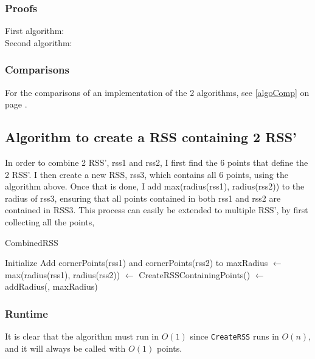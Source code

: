 \subsubsection{Proofs}
\begin{description}
\item[First algorithm:]

\item[Second algorithm:]
\end{description}

\subsubsection{Comparisons}
For the comparisons of an implementation of the 2 algorithms, see \ref{algoComp} on page \pageref{algoComp}.

\subsection{Algorithm to create a RSS containing 2 RSS'}
In order to combine  2 RSS', rss1 and rss2, I first find the 6 points that define the 2 RSS'. I then create a new RSS, rss3, which contains all 6 points, using the algorithm above. Once that is done, I add  max(radius(rss1), radius(rss2)) to the radius of rss3, ensuring that all points contained in both rss1 and rss2 are contained in RSS3. This process can easily be extended to multiple RSS', by first collecting all the points, 

\begin{algorithm}[H]
  \caption{CombinedRSS}
   
  \dontprintsemicolon
  Initialize \points \;
  Add cornerPoints(rss1) and cornerPoints(rss2) to \points \;
  maxRadius $\gets$ max(radius(rss1), radius(rss2)) \;
  \crss $\gets$ CreateRSSContainingPoints(\points) \;
  \crss $\gets$ addRadius(\crss, maxRadius) \;
  \return \crss
\end{algorithm}

\subsubsection{Runtime}
It is clear that the algorithm must run in $O(1)$ since \texttt{CreateRSS} runs in $O(n)$, and it will always be called with $O(1)$ points.


